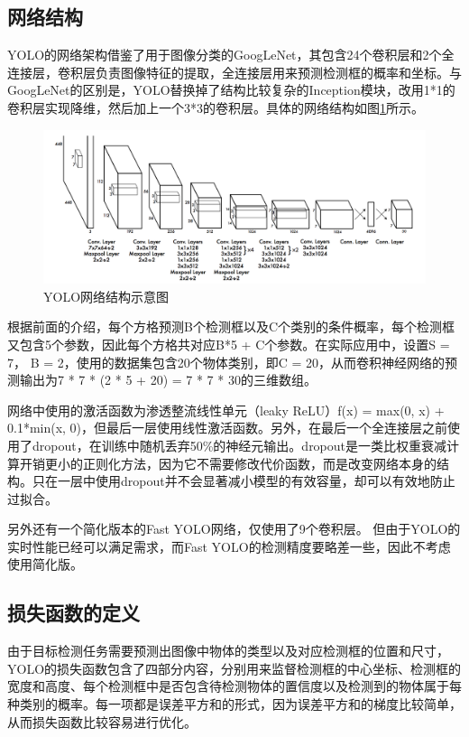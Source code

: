\subsection{网络结构}
YOLO的网络架构借鉴了用于图像分类的GoogLeNet\cite{szegedy2015going}，其包含24个卷积层和2个全连接层，卷积层负责图像特征的提取，全连接层用来预测检测框的概率和坐标。与GoogLeNet的区别是，YOLO替换掉了结构比较复杂的Inception模块，改用1*1的卷积层实现降维，然后加上一个3*3的卷积层。具体的网络结构如图\ref{fig:3_2_YOLO网络结构}所示。

\begin{figure}[htb] %
	\centering
	\includegraphics[width=5in]{figures/3_2_YOLO网络结构}
	\caption{YOLO网络结构示意图} \label{fig:3_2_YOLO网络结构}
\end{figure}

根据前面的介绍，每个方格预测B个检测框以及C个类别的条件概率，每个检测框又包含5个参数，因此每个方格共对应B*5 + C个参数。在实际应用中，设置S = 7， B = 2，使用的数据集包含20个物体类别，即C = 20，从而卷积神经网络的预测输出为7 * 7 * (2 * 5 + 20) = 7 * 7 * 30的三维数组。

网络中使用的激活函数为渗透整流线性单元（leaky ReLU）f(x) = max(0, x) + 0.1*min(x, 0)，但最后一层使用线性激活函数。另外，在最后一个全连接层之前使用了dropout\cite{hinton2012improving}，在训练中随机丢弃50\%的神经元输出。dropout是一类比权重衰减计算开销更小的正则化方法，因为它不需要修改代价函数，而是改变网络本身的结构。只在一层中使用dropout并不会显著减小模型的有效容量，却可以有效地防止过拟合。

另外还有一个简化版本的Fast YOLO网络，仅使用了9个卷积层。 但由于YOLO的实时性能已经可以满足需求，而Fast YOLO的检测精度要略差一些，因此不考虑使用简化版。


\subsection{损失函数的定义} %
由于目标检测任务需要预测出图像中物体的类型以及对应检测框的位置和尺寸，YOLO的损失函数包含了四部分内容，分别用来监督检测框的中心坐标、检测框的宽度和高度、每个检测框中是否包含待检测物体的置信度以及检测到的物体属于每种类别的概率。每一项都是误差平方和的形式，因为误差平方和的梯度比较简单，从而损失函数比较容易进行优化。

